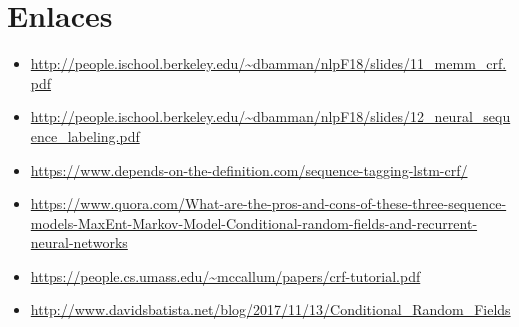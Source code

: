 \section{Enlaces}

\begin{itemize}

\item \url{http://people.ischool.berkeley.edu/~dbamman/nlpF18/slides/11_memm_crf.pdf}

\item \url{http://people.ischool.berkeley.edu/~dbamman/nlpF18/slides/12_neural_sequence_labeling.pdf}

\item \url{https://www.depends-on-the-definition.com/sequence-tagging-lstm-crf/}

\item \url{https://www.quora.com/What-are-the-pros-and-cons-of-these-three-sequence-models-MaxEnt-Markov-Model-Conditional-random-fields-and-recurrent-neural-networks}

\item \url{https://people.cs.umass.edu/~mccallum/papers/crf-tutorial.pdf}

\item \url{http://www.davidsbatista.net/blog/2017/11/13/Conditional_Random_Fields}

\end{itemize}


